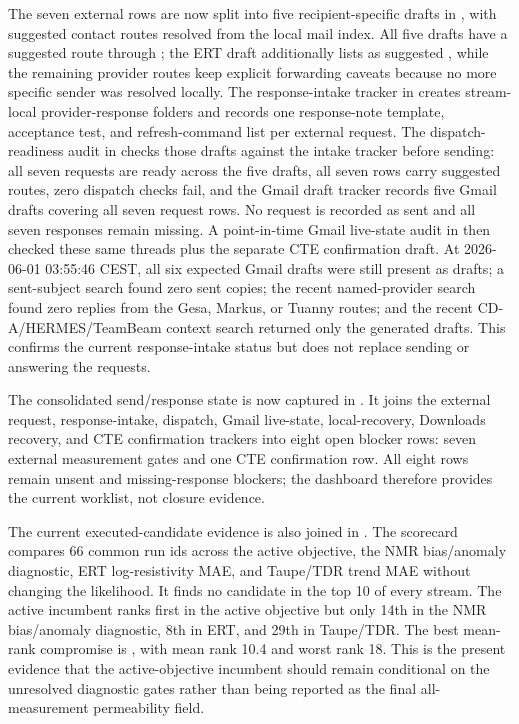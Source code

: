 The seven external rows are now split into five recipient-specific drafts in
, with suggested contact
routes resolved from the local mail index.  All five drafts have a suggested
 route through ; the ERT draft additionally lists
 as suggested , while the remaining provider
routes keep explicit forwarding caveats because no more specific sender was
resolved locally.  The response-intake tracker
in  creates stream-local
provider-response folders and records one response-note template, acceptance test,
and refresh-command list per external request.  The dispatch-readiness audit in
 checks those drafts against
the intake tracker before sending: all seven requests are ready across the five
drafts, all seven rows carry suggested  routes, zero dispatch checks fail,
and the Gmail draft tracker
 records five Gmail drafts
covering all seven request rows.  No request is recorded as sent and all seven
responses remain missing.
A point-in-time Gmail live-state audit in
 then checked these same
threads plus the separate CTE confirmation draft.  At 2026-06-01 03:55:46 CEST, all six
expected Gmail drafts were still present as drafts; a sent-subject search found zero
sent copies; the recent named-provider search found zero replies from the Gesa,
Markus, or Tuanny routes; and the recent CD-A/HERMES/TeamBeam context search returned
only the generated drafts.  This confirms the current response-intake status but does
not replace sending or answering the requests.

The consolidated send/response state is now captured in
.  It joins the external
request, response-intake, dispatch, Gmail live-state, local-recovery, Downloads
recovery, and CTE confirmation trackers into eight open blocker rows: seven external
measurement gates and one CTE confirmation row.  All eight rows remain unsent and
missing-response blockers; the dashboard therefore provides the current worklist,
not closure evidence.

The current executed-candidate evidence is also joined in
.  The scorecard
compares 66 common run ids across the active objective, the NMR bias/anomaly
diagnostic, ERT log-resistivity MAE, and Taupe/TDR trend MAE without changing the
likelihood.  It finds no candidate in the top 10 of every stream.  The active
incumbent
 ranks first in the
active objective but only 14th in the NMR bias/anomaly diagnostic, 8th in ERT, and
29th in Taupe/TDR.  The best mean-rank compromise is
, with mean rank 10.4
and worst rank 18.  This is the present evidence that the active-objective incumbent
should remain conditional on the unresolved diagnostic gates rather than being
reported as the final all-measurement permeability field.

